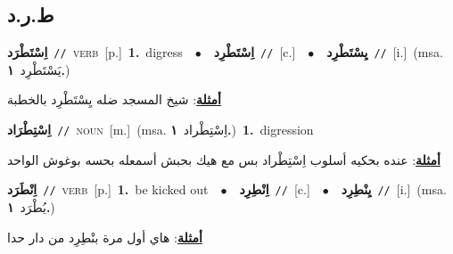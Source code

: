 \documentclass[10pt,a4paper,twoside]{article} %
\begin{document}
\begin{multicols}{2}
\vspace{-3mm}
\subsection*{\color{blue}\foreignlanguage{arabic}{ط.ر.د}\color{blue}{}} 

{\setlength\topsep{0pt}\textbf{\foreignlanguage{arabic}{اِسْتَطْرَد}}\ {\color{gray}\texttt{//}\color{black}}\ \textsc{verb}\ [p.]\ \textbf{1.}~digress\ \ $\bullet$\ \ \setlength\topsep{0pt}\textbf{\foreignlanguage{arabic}{اِسْتَطْرِد}}\ {\color{gray}\texttt{//}\color{black}}\ [c.]\ \ $\bullet$\ \ \setlength\topsep{0pt}\textbf{\foreignlanguage{arabic}{يِسْتَطْرِد}}\ {\color{gray}\texttt{//}\color{black}}\ [i.]\ \color{gray}(msa. \foreignlanguage{arabic}{يَسْتَطْرِد}~\foreignlanguage{arabic}{\textbf{١.}})\color{black}\  \begin{flushright}\color{gray}\foreignlanguage{arabic}{\textbf{\underline{\foreignlanguage{arabic}{أمثلة}}}: شيخ المسجد ضله يِسْتَطْرِد بالخطبة}\end{flushright}\color{black}} \vspace{2mm}

{\setlength\topsep{0pt}\textbf{\foreignlanguage{arabic}{اِسْتِطْرَاد}}\ {\color{gray}\texttt{//}\color{black}}\ \textsc{noun}\ [m.]\ \color{gray}(msa. \foreignlanguage{arabic}{اِسْتِطْراد}~\foreignlanguage{arabic}{\textbf{١.}})\color{black}\ \textbf{1.}~digression\  \begin{flushright}\color{gray}\foreignlanguage{arabic}{\textbf{\underline{\foreignlanguage{arabic}{أمثلة}}}: عنده بحكيه أسلوب اِسْتِطْراد بس مع هيك بحبش أسمعله بحسه بوغوش الواحد}\end{flushright}\color{black}} \vspace{2mm}

{\setlength\topsep{0pt}\textbf{\foreignlanguage{arabic}{اِنْطَرَد}}\ {\color{gray}\texttt{//}\color{black}}\ \textsc{verb}\ [p.]\ \textbf{1.}~be kicked out\ \ $\bullet$\ \ \setlength\topsep{0pt}\textbf{\foreignlanguage{arabic}{اِنْطِرِد}}\ {\color{gray}\texttt{//}\color{black}}\ [c.]\ \ $\bullet$\ \ \setlength\topsep{0pt}\textbf{\foreignlanguage{arabic}{يِنْطِرِد}}\ {\color{gray}\texttt{//}\color{black}}\ [i.]\ \color{gray}(msa. \foreignlanguage{arabic}{يُطْرَد}~\foreignlanguage{arabic}{\textbf{١.}})\color{black}\  \begin{flushright}\color{gray}\foreignlanguage{arabic}{\textbf{\underline{\foreignlanguage{arabic}{أمثلة}}}: هاي أول مرة بنْطِرِد من دار حدا}\end{flushright}\color{black}} \vspace{2mm}


\end{multicols}
\end{document}
